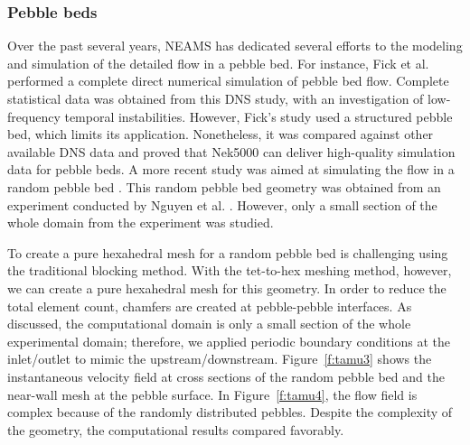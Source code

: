 \subsubsection{Pebble beds}

Over the past several years, NEAMS has dedicated several efforts to the modeling and simulation of the detailed flow in a pebble bed. For instance, Fick et al. \cite{fick2017direct}  performed a complete direct numerical simulation of pebble bed flow. Complete statistical data was obtained from this DNS study, with an investigation of low-frequency temporal instabilities. However, Fick's study \cite{fick2017direct} used a structured pebble bed, which limits its application. Nonetheless, it was compared against other available DNS data and proved that Nek5000 can deliver high-quality simulation data for pebble beds. A more recent study was aimed at simulating the flow in a random pebble bed \cite{yildiz2020direct}. This random pebble bed geometry was obtained from an experiment conducted by Nguyen et al. \cite{nguyen2018time}. However, only a small section of the whole domain from the experiment was studied.

To create a pure hexahedral mesh for a random pebble bed is challenging using the traditional blocking method. With the tet-to-hex meshing method, however, we can create a pure hexahedral mesh for this geometry. In order to reduce the total element count, chamfers are created at pebble-pebble interfaces. As discussed, the computational domain is only a small section of the whole experimental domain; therefore, we applied periodic boundary conditions at the inlet/outlet to mimic the upstream/downstream. Figure~\ref{f:tamu3} shows the instantaneous velocity field at cross sections of the random pebble bed and the near-wall mesh at the pebble surface. In Figure~\ref{f:tamu4}, the flow field is complex because of the randomly distributed pebbles. Despite the complexity of the geometry, the computational results compared favorably.

